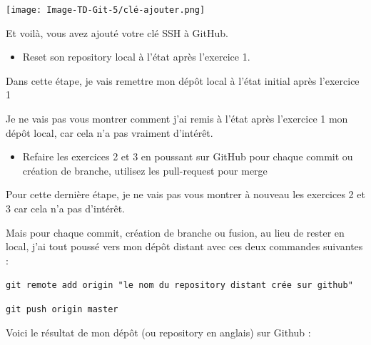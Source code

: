 \documentclass[12pt]{article}
\begin{document}
\vspace{0.3cm}

\begin{center}
  \texttt{[image: Image-TD-Git-5/clé-ajouter.png]}
\end{center}

\vspace{0.3cm}

Et voilà, vous avez ajouté votre clé SSH à GitHub.

\vspace{0.3cm}

\begin{itemize}
  \item Reset son repository local à l'état après l'exercice 1.
\end{itemize}

\vspace{0.3cm}

Dans cette étape, je vais remettre mon dépôt local à l'état initial après l'exercice 1

Je ne vais pas vous montrer comment j'ai remis à l'état après l'exercice 1 mon dépôt local, car cela n'a pas vraiment d'intérêt.

\vspace{0.3cm}

\begin{itemize}
  \item Refaire les exercices 2 et 3 en poussant sur GitHub pour chaque commit ou création de branche, utilisez les pull-request pour merge
\end{itemize}

\vspace{0.3cm}

Pour cette dernière étape, je ne vais pas vous montrer à nouveau les exercices 2 et 3 car cela n'a pas d'intérêt. \newline

Mais pour chaque commit, création de branche ou fusion, au lieu de rester en local, j'ai tout poussé vers mon dépôt distant avec ces deux commandes suivantes :

\texttt{git remote add origin "le nom du repository distant crée sur github"}

\texttt{git push origin master}

\vspace{0.3cm}

Voici le résultat de mon dépôt (ou repository en anglais) sur Github :

\vspace{0.3cm}
\end{document}

